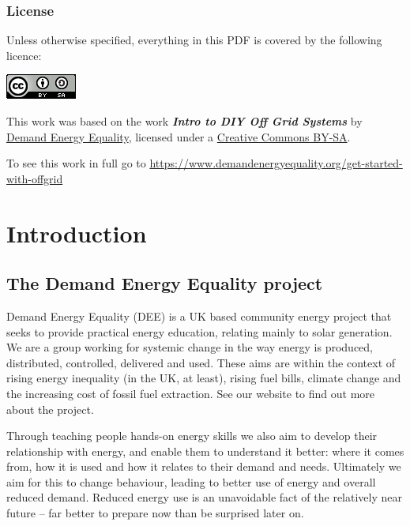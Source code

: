 \documentclass{article}
\theoremstyle{definition}
\theoremstyle{definition}
\theoremstyle{remark}
\begin{document}
  \subsubsection*{License} %
  \label{ssub:license}

    Unless otherwise specified, everything in this PDF is covered by the following licence:

    \includegraphics[]{../Images/image_0_2_(license).png} \newline

    This work was based on the work \textbf{\textit{Intro to DIY Off Grid Systems}} by \href{https://www.demandenergyequality.org/}{Demand Energy Equality}, licensed under a \href{https://creativecommons.org/licenses/by-sa/4.0/legalcode}{Creative Commons BY-SA}.

    To see this work in full go to \href{https://www.demandenergyequality.org/get-started-with-offgrid}{https://www.demandenergyequality.org/get-started-with-offgrid}
  


\newpage

\section{Introduction} %
\label{sec:introduction}

  \subsection{The Demand Energy Equality project} %
  \label{sub:the_demand_energy_equality_project}

    Demand Energy Equality (DEE) is a UK based community energy project that seeks to provide practical energy education, relating mainly to solar generation. We are a group working for systemic change in the way energy is produced, distributed, controlled, delivered and used. These aims are within the context of rising energy inequality (in the UK, at least), rising fuel bills, climate change and the increasing cost of fossil fuel extraction. See our website to find out more about the project.

    Through teaching people hands-on energy skills we also aim to develop their relationship with energy, and enable them to understand it better: where it comes from, how it is used and how it relates to their demand and needs. Ultimately we aim for this to change behaviour, leading to better use of energy and overall reduced demand. Reduced energy use is an unavoidable fact of the relatively near future – far better to prepare now than be surprised later on.
\end{document}
